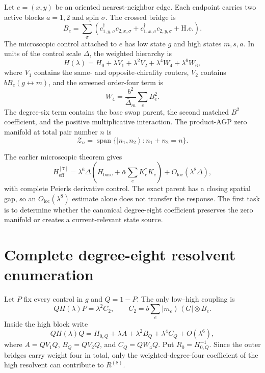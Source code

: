 \documentclass[11pt]{article}
\theoremstyle{definition}
\theoremstyle{remark}
\newcommand{\cZ}{\mathcal Z}
\newcommand{\Span}{\operatorname{span}}
\newcommand{\ket}[1]{\left|#1\right\rangle}
\newcommand{\bra}[1]{\left\langle#1\right|}
\begin{document}
Let $e=(x,y)$ be an oriented nearest-neighbor edge.  Each endpoint carries two active blocks $a=1,2$ and spin $\sigma$.  The crossed bridge is
\begin{equation}
 B_e=\sum_\sigma\left(
 c_{1,y,\sigma}^\dagger c_{2,x,\sigma}
 +c_{1,x,\sigma}^\dagger c_{2,y,\sigma}+\mathrm{H.c.}\right).
 \label{eq:bridge}
\end{equation}
The microscopic control attached to $e$ has low state $g$ and high states $m,s,a$.  In units of the control scale $\Delta$, the weighted hierarchy is
\begin{equation}
 H(\lambda)=H_0+\lambda V_1+\lambda^2V_2
 +\lambda^4W_4+\lambda^6W_6,
 \label{eq:hierarchy}
\end{equation}
where $V_1$ contains the same- and opposite-chirality routers, $V_2$ contains $bB_e(g\leftrightarrow m)$, and the screened order-four term is
\begin{equation}
 W_4=\frac{b^2}{\bar\Delta_m}\sum_eB_e^2.
 \label{eq:W4}
\end{equation}
The degree-six term contains the base swap parent, the second matched $B^2$ coefficient, and the positive multiplicative interaction.  The product-AGP zero manifold at total pair number $n$ is
\begin{equation}
 \cZ_n=\Span\{\ket{n_1,n_2}:n_1+n_2=n\}.
 \label{eq:Z}
\end{equation}

The earlier microscopic theorem \cite{SledgianowskiMicro} gives
\begin{equation}
 H_{\mathrm{eff}}^{[7]}
 =\lambda^6\Delta\left(H_{\mathrm{base}}+\bar\alpha\sum_eK_e^\dagger K_e\right)
 +O_{\mathrm{loc}}(\lambda^8\Delta),
 \label{eq:degree6}
\end{equation}
with complete Peierls derivative control.  The exact parent has a closing spatial gap, so an $O_{\mathrm{loc}}(\lambda^8)$ estimate alone does not transfer the response.  The first task is to determine whether the canonical degree-eight coefficient preserves the zero manifold or creates a current-relevant state source.

\section{Complete degree-eight resolvent enumeration}\label{sec:enumeration}

Let $P$ fix every control in $g$ and $Q=1-P$.  The only low--high coupling is
\begin{equation}
 QH(\lambda)P=\lambda^2C_2,
 \qquad
 C_2=b\sum_e\ket{m_e}\bra{G}\otimes B_e.
 \label{eq:C2}
\end{equation}
Inside the high block write
\begin{equation}
 QH(\lambda)Q=H_{0,Q}+\lambda A+\lambda^2B_Q+\lambda^4C_Q+O(\lambda^6),
 \label{eq:HQ}
\end{equation}
where $A=QV_1Q$, $B_Q=QV_2Q$, and $C_Q=QW_4Q$.  Put $R_0=H_{0,Q}^{-1}$.  Since the outer bridges carry weight four in total, only the weighted-degree-four coefficient of the high resolvent can contribute to $R^{(8)}$.
\end{document}
